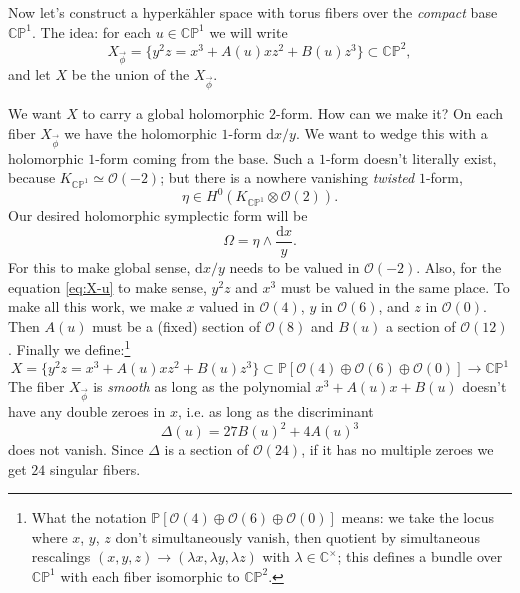 \documentclass[12pt,letterpaper,reqno]{article}
\numberwithin{equation}{section}
\newcommand{\cO}{\ensuremath{\mathcal O}}
\newcommand{\C}{\ensuremath{\mathbb C}}
\newcommand{\PP}{\ensuremath{\mathbb P}}
\newcommand{\hk}{hyperk\"ahler\xspace}
\newcommand{\de}{\mathrm{d}}
\newcommand{\ti}[1]{\textit{#1}}
\begin{document}
\begin{example} \label{exa:elliptically-fibered-k3}
Now let's construct a \hk space with torus fibers over the \ti{compact}
base $\C\PP^1$. The idea: for each $u \in \C\PP^1$ we will write
\begin{equation} \label{eq:X-u}
  X_{\vec \phi} = \{ y^2 z = x^3 + A(u) xz^2 + B(u) z^3 \} \subset \C\PP^2,
\end{equation}
and let $X$ be the union of the $X_{\vec \phi}$.

We want $X$ to carry a global holomorphic $2$-form. How can we make it?
On each fiber $X_{\vec \phi}$ we have the holomorphic $1$-form $\de x / y$.
We want to wedge this with
a holomorphic $1$-form coming from the base. Such a $1$-form
doesn't literally exist, because $K_{\C\PP^1} \simeq \cO(-2)$; but there is
a nowhere vanishing \ti{twisted} $1$-form,
\begin{equation}
  \eta \in H^0(K_{\C\PP^1} \otimes \cO(2)).
\end{equation}
Our desired holomorphic symplectic form will be
\begin{equation}
  \Omega = \eta \wedge \frac{\de x}{y}.
\end{equation}
For this to make global sense, $\de x/y$ needs to be
valued in $\cO(-2)$. Also, for the equation \eqref{eq:X-u}
to make sense, $y^2 z$ and $x^3$ must be valued in the same place.
To make all this work, we make $x$ valued in $\cO(4)$, $y$ in $\cO(6)$,
and $z$ in $\cO(0)$. Then $A(u)$ must be a (fixed) section of $\cO(8)$
and $B(u)$ a section of $\cO(12)$.
Finally we define:\footnote{What the notation $\PP[\cO(4) \oplus \cO(6) \oplus \cO(0)]$ means: we take the locus where $x$, $y$, $z$ don't
simultaneously vanish, then quotient by simultaneous rescalings
$(x,y,z) \to (\lambda x, \lambda y, \lambda z)$ with $\lambda \in \C^\times$;
this defines a bundle over $\C\PP^1$ with each fiber isomorphic to $\C\PP^2$.}
\begin{equation}
  X = \{ y^2 z = x^3 + A(u) xz^2 + B(u) z^3 \} \subset \PP[\cO(4) \oplus \cO(6) \oplus \cO(0)] \to \C\PP^1
\end{equation}
The fiber $X_{\vec \phi}$ is \ti{smooth} as long as the polynomial
$x^3 + A(u) x + B(u)$ doesn't have any double zeroes in $x$,
i.e. as long as the discriminant
\begin{equation}
  \Delta(u) = 27 B(u)^2 + 4 A(u)^3
\end{equation}
does not vanish. Since $\Delta$ is a section of $\cO(24)$,
if it has no multiple zeroes we get $24$ singular fibers.

\end{example}
\end{document}
